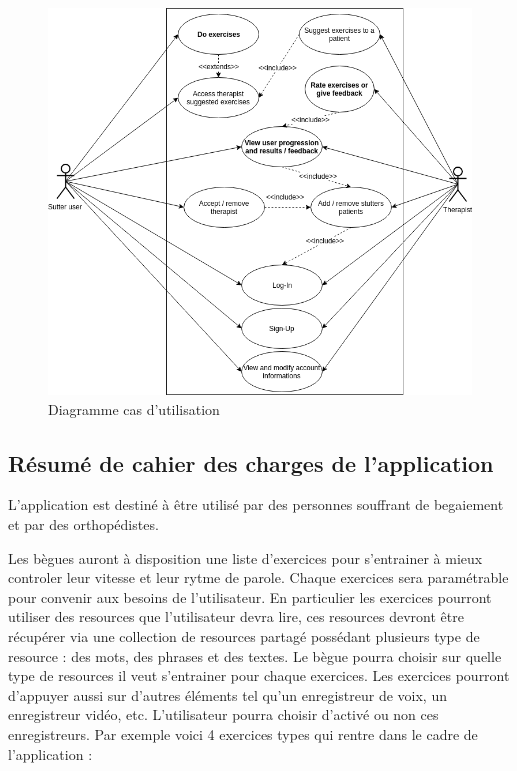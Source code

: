 \begin{figure}
  \includegraphics[width=.9\linewidth]{content/imgs/usecase.png}
  \caption{Diagramme cas d'utilisation}
  \label{fig:srs}
\end{figure}

\subsection{Résumé de cahier des charges de l'application}

L'application est destiné à être utilisé par des personnes souffrant de begaiement et par des orthopédistes.

Les bègues auront à disposition une liste d'exercices pour s'entrainer à mieux controler leur vitesse et leur rytme de parole. Chaque exercices sera paramétrable pour convenir aux besoins de l'utilisateur. En particulier les exercices pourront utiliser des resources que l'utilisateur devra lire, ces resources devront être récupérer via une collection de resources partagé possédant plusieurs type de resource : des mots, des phrases et des textes. Le bègue pourra choisir sur quelle type de resources il veut s'entrainer pour chaque exercices. Les exercices pourront d'appuyer aussi sur d'autres éléments tel qu'un enregistreur de voix, un enregistreur vidéo, etc. L'utilisateur pourra choisir d'activé ou non ces enregistreurs. Par exemple voici 4 exercices types qui rentre dans le cadre de l'application :

